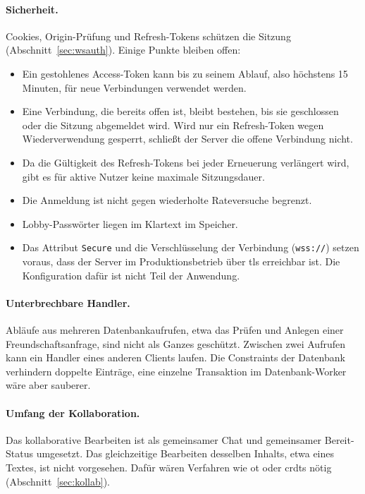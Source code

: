 \paragraph{Sicherheit.} Cookies, Origin-Prüfung und Refresh-Tokens schützen die Sitzung (Abschnitt~\ref{sec:wsauth}). Einige Punkte bleiben offen:
\begin{itemize}
  \item Ein gestohlenes Access-Token kann bis zu seinem Ablauf, also höchstens 15 Minuten, für neue Verbindungen verwendet werden.
  \item Eine Verbindung, die bereits offen ist, bleibt bestehen, bis sie geschlossen oder die Sitzung abgemeldet wird. Wird nur ein Refresh-Token wegen Wiederverwendung gesperrt, schließt der Server die offene Verbindung nicht.
  \item Da die Gültigkeit des Refresh-Tokens bei jeder Erneuerung verlängert wird, gibt es für aktive Nutzer keine maximale Sitzungsdauer.
  \item Die Anmeldung ist nicht gegen wiederholte Rateversuche begrenzt.
  \item Lobby-Passwörter liegen im Klartext im Speicher.
  \item Das Attribut \texttt{Secure} und die Verschlüsselung der Verbindung (\texttt{wss://}) setzen voraus, dass der Server im Produktionsbetrieb über \gls{tls} erreichbar ist. Die Konfiguration dafür ist nicht Teil der Anwendung.
\end{itemize}

\paragraph{Unterbrechbare Handler.} Abläufe aus mehreren Datenbankaufrufen, etwa das Prüfen und Anlegen einer Freundschaftsanfrage, sind nicht als Ganzes geschützt. Zwischen zwei Aufrufen kann ein Handler eines anderen Clients laufen. Die Constraints der Datenbank verhindern doppelte Einträge, eine einzelne Transaktion im Datenbank-Worker wäre aber sauberer.

\paragraph{Umfang der Kollaboration.} Das kollaborative Bearbeiten ist als gemeinsamer Chat und gemeinsamer Bereit-Status umgesetzt. Das gleichzeitige Bearbeiten desselben Inhalts, etwa eines Textes, ist nicht vorgesehen. Dafür wären Verfahren wie \gls{ot} oder \glspl{crdt} nötig (Abschnitt~\ref{sec:kollab}).
